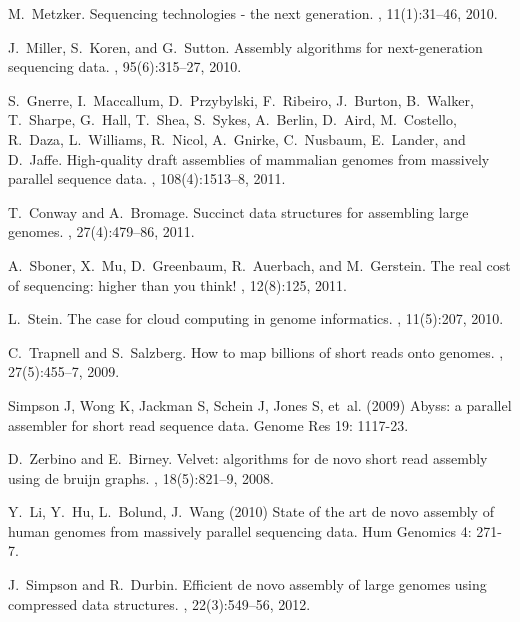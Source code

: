 \documentclass{pnastwo}
\begin{document}
\begin{article}
\begin{thebibliography}{20}
M.~Metzker.
\newblock Sequencing technologies - the next generation.
, 11(1):31--46, 2010.

J.~Miller, S.~Koren, and G.~Sutton.
\newblock Assembly algorithms for next-generation sequencing data.
, 95(6):315--27, 2010.

S.~Gnerre, I.~Maccallum, D.~Przybylski, F.~Ribeiro, J.~Burton, B.~Walker,
  T.~Sharpe, G.~Hall, T.~Shea, S.~Sykes, A.~Berlin, D.~Aird, M.~Costello,
  R.~Daza, L.~Williams, R.~Nicol, A.~Gnirke, C.~Nusbaum, E.~Lander, and
  D.~Jaffe.
\newblock High-quality draft assemblies of mammalian genomes from massively
  parallel sequence data.
, 108(4):1513--8, 2011.

T.~Conway and A.~Bromage.
\newblock Succinct data structures for assembling large genomes.
, 27(4):479--86, 2011.

A.~Sboner, X.~Mu, D.~Greenbaum, R.~Auerbach, and M.~Gerstein.
\newblock The real cost of sequencing: higher than you think!
, 12(8):125, 2011.

L.~Stein.
\newblock The case for cloud computing in genome informatics.
, 11(5):207, 2010.

C.~Trapnell and S.~Salzberg.
\newblock How to map billions of short reads onto genomes.
, 27(5):455--7, 2009.

Simpson J, Wong K, Jackman S, Schein J, Jones S, et~al. (2009)
\newblock Abyss: a parallel assembler for short read sequence data.
\newblock Genome Res 19: 1117-23.

D.~Zerbino and E.~Birney.
\newblock Velvet: algorithms for de novo short read assembly using de bruijn
  graphs.
, 18(5):821--9, 2008.

Y.~Li, Y.~Hu, L.~Bolund, J.~Wang (2010)
\newblock State of the art de novo assembly of human genomes from massively parallel sequencing data.
\newblock Hum Genomics 4: 271-7.

J.~Simpson and R.~Durbin.
\newblock Efficient de novo assembly of large genomes using compressed data
  structures.
, 22(3):549--56, 2012.


\end{thebibliography}
\end{article}
\end{document}
